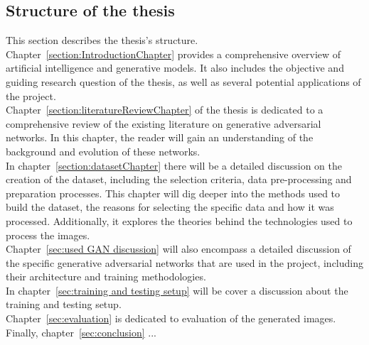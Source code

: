 \subsection{Structure of the thesis}
This section describes the thesis's structure. Chapter~\ref{section:IntroductionChapter} provides a comprehensive overview of artificial intelligence and generative models. It also includes the objective and guiding research question of the thesis, as well as several potential applications of the project.\\
Chapter~\ref{section:literatureReviewChapter} of the thesis is dedicated to a comprehensive review of the existing literature on generative adversarial networks. In this chapter, the reader will gain an understanding of the background and evolution of these networks.\\
In chapter~\ref{section:datasetChapter} there will be a detailed discussion on the creation of the dataset, including the selection criteria, data pre-processing and preparation processes. This chapter will dig deeper into the methods used to build the dataset, the reasons for selecting the specific data and how it was processed. Additionally, it explores the theories behind the technologies used to process the images.\\
Chapter~\ref{sec:used GAN discussion} will also encompass a detailed discussion of the specific generative adversarial networks that are used in the project, including their architecture and training methodologies.\\
In chapter~\ref{sec:training and testing setup} will be cover a discussion about the training and testing setup.\\
Chapter~\ref{sec:evaluation} is dedicated to evaluation of the generated images.\\
Finally, chapter~\ref{sec:conclusion} ...\\
